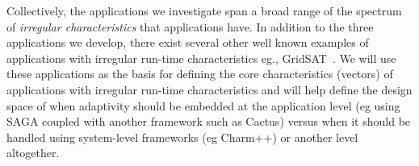 \documentclass[a4paper,10pt]{article}
\begin{document}
Collectively, the applications we investigate span a broad range of
the spectrum of {\it irregular characteristics} that applications
have.  In addition to the three applications we develop, there exist
several other well known examples of applications with irregular
run-time characteristics eg., GridSAT~\cite{gridsat03,
  majority_voting}. We will use these applications as the basis for
defining the core characteristics (vectors) of applications with
irregular run-time characteristics and will help define the design
space of when adaptivity should be embedded at the application level
(eg using SAGA coupled with another framework such as Cactus) versus
when it should be handled using system-level frameworks (eg Charm++)
or another level altogether.





\end{document}
